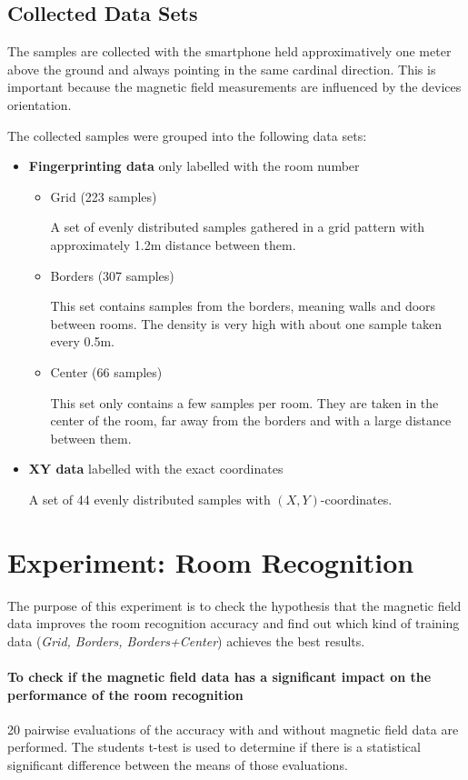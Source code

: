 \subsection{Collected Data Sets}

The samples are collected with the smartphone held approximatively one meter above the ground and always pointing in the same cardinal direction. This is important because the magnetic field measurements are influenced by the devices orientation.

The collected samples were grouped into the following data sets:

\begin{itemize}
\item \textbf{Fingerprinting data} only labelled with the room number
	\begin{itemize}
	\item Grid (223 samples)

	A set of evenly distributed samples gathered in a grid pattern with approximately 1.2m distance between them.
	\item Borders (307 samples)
	
	This set contains samples from the borders, meaning walls and doors between rooms. The density is very high with about one sample taken every 0.5m.
	\item Center (66 samples)
	
	This set only contains a few samples per room. They are taken in the center of the room, far away from the borders and with a large distance between them.
	\end{itemize}
 \item \textbf{XY data} labelled with the exact coordinates
 
 A set of 44 evenly distributed samples with \((X,Y)\)-coordinates.
\end{itemize}

\section{Experiment: Room Recognition}

The purpose of this experiment is to check the hypothesis that the magnetic field data improves the room recognition accuracy and find out which kind of training data (\emph{Grid, Borders, Borders+Center}) achieves the best results. 
\paragraph{To check if the magnetic field data has a significant impact on the performance of the room recognition} 20 pairwise evaluations of the accuracy with and without magnetic field data are performed. The students t-test is used to determine if there is a statistical significant difference between the means of those evaluations.

